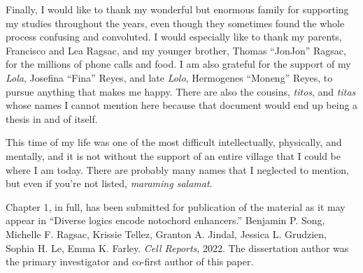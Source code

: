 \documentclass[11pt]{formatting-template}
\begin{document}
\begin{acknowledgements}
	Finally, I would like to thank my wonderful but enormous family for supporting my studies throughout the years, even though they sometimes found the whole process confusing and convoluted. I would especially like to thank my parents, Francisco and Lea Ragsac, and my younger brother, Thomas “JonJon” Ragsac, for the millions of phone calls and food. I am also grateful for the support of my \textit{Lola}, Josefina “Fina” Reyes, and late \textit{Lolo}, Hermogenes “Moneng” Reyes, to pursue anything that makes me happy. There are also the cousins, \textit{titos}, and \textit{titas} whose names I cannot mention here because that document would end up being a thesis in and of itself. 
	
	This time of my life was one of the most difficult intellectually, physically, and mentally, and it is not without the support of an entire village that I could be where I am today. There are probably many names that I neglected to mention, but even if you’re not listed, \textit{maraming salamat}.
	
	Chapter 1, in full, has been submitted for publication of the material as it may appear in “Diverse logics encode notochord enhancers.” Benjamin P. Song, Michelle F. Ragsac, Krissie Tellez, Granton A. Jindal, Jessica L. Grudzien, Sophia H. Le, Emma K. Farley. \textit{Cell Reports}, 2022. The dissertation author was the primary investigator and co-first author of this paper.
\end{acknowledgements}
\end{document}

